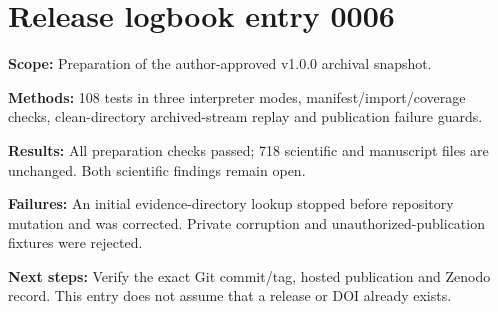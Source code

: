 \section*{Release logbook entry 0006}
\textbf{Scope:} Preparation of the author-approved v1.0.0 archival snapshot.

\textbf{Methods:} 108 tests in three interpreter modes, manifest/import/coverage checks, clean-directory archived-stream replay and publication failure guards.

\textbf{Results:} All preparation checks passed; 718 scientific and manuscript files are unchanged. Both scientific findings remain open.

\textbf{Failures:} An initial evidence-directory lookup stopped before repository mutation and was corrected. Private corruption and unauthorized-publication fixtures were rejected.

\textbf{Next steps:} Verify the exact Git commit/tag, hosted publication and Zenodo record. This entry does not assume that a release or DOI already exists.

